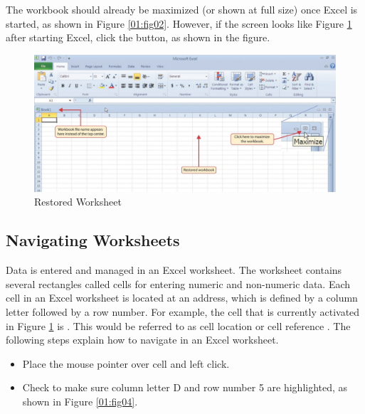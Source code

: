 The workbook should already be maximized (or shown at full size) once Excel is started, as shown in Figure \ref{01:fig02}. However, if the screen looks like Figure \ref{01:fig03} after starting Excel, click the  button, as shown in the figure.

\begin{figure}[H]
	\centering
	\includegraphics[width=\maxwidth{.95\linewidth}]{gfx/ch01_fig03}
	\caption{Restored Worksheet}
	\label{01:fig03}
\end{figure}

\subsection{Navigating Worksheets}

Data is entered and managed in an Excel worksheet. The worksheet contains several rectangles called cells for entering numeric and non-numeric data. Each cell in an Excel worksheet is located at an address, which is defined by a column letter followed by a row number. For example, the cell that is currently activated in Figure \ref{01:fig03} is . This would be referred to as cell location  or cell reference . The following steps explain how to navigate in an Excel worksheet.

\begin{itemize}
	\item Place the mouse pointer over cell  and left click.
	\item Check to make sure column letter D and row number 5 are highlighted, as shown in Figure \ref{01:fig04}.
\end{itemize}

